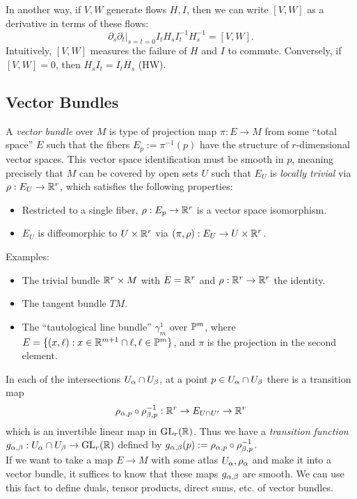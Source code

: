 \documentclass{amsart}
\begin{document}
In another way, if $V,W$ generate flows $H,I$, then we can write $[V,W]$ as a derivative in terms of these flows:
$$
\partial_s\partial_t\big|_{s=t=0} I_tH_sI_t^{-1}H_s^{-1} = [V,W].
$$
Intuitively, $[V,W]$ measures the failure of $H$ and $I$ to commute. Conversely, if $[V,W]=0$, then $H_sI_t=I_tH_s$ (HW).\\

\subsection{Vector Bundles}

A \textit{vector bundle} over $M$ is type of projection map $\pi:E\to M$ from some ``total space'' $E$ such that the fibers $E_p:=\pi^{-1}(p)$ have the structure of $r$-dimensional vector spaces. This vector space identification must be smooth in $p$, meaning precisely that $M$ can be covered by open sets $U$ such that $E_U$ is \textit{locally trivial} via $\rho:E_U\to \R^r$, which satisfies the following properties:
\begin{itemize}
	\item Restricted to a single fiber, $\rho:E_p\to \R^r$ is a vector space isomorphism.
	\item $E_U$ is diffeomorphic to $U\times \R^r$ via $(\pi,\rho):E_U\to U\times \R^r$.\\
\end{itemize}

Examples:
\begin{itemize}
	\item The trivial bundle $\R^r\times M$ with $E=\R^r$ and $\rho:\R^r\to \R^r$ the identity.
	\item The tangent bundle $TM$. 
	\item The ``tautological line bundle'' $\gamma_m^1$ over $\P^m$, where $E=\{(x,\ell):x\in \R^{m+1}\cap \ell, \ell\in \P^m\}$, and $\pi$ is the projection in the second element.\\
\end{itemize}

In each of the intersections $U_{\a}\cap U_{\b}$, at a point $p\in U_{\a}\cap U_{\b}$ there is a transition map 
$$
\rho_{\a,p}\circ \rho_{\b,p}^{-1} : \R^r\to E_{U\cap U'} \to \R^r
$$
which is an invertible linear map in $\GL_r(\R)$. Thus we have a \textit{transition function} $g_{\a,\b}:U_{\a}\cap U_{\b}\to \GL_r(\R)$ defined by $g_{\a,\b}(p) := \rho_{\a,p}\circ \rho_{\b,p}^{-1}$.\\

If we want to take a map $E\to M$ with some atlas $U_{\a},\rho_{\a}$ and make it into a vector bundle, it suffices to know that these maps $g_{\a,\b}$ are smooth. We can use this fact to define duals, tensor products, direct sums, etc. of vector bundles.\\
\end{document}
